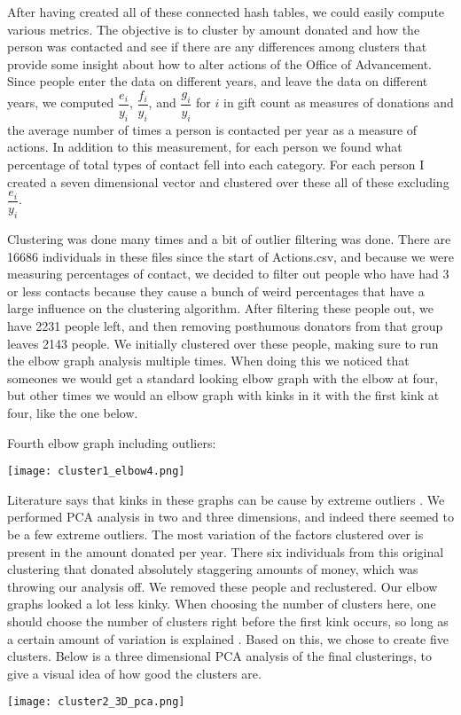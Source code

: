 \documentclass[../main.tex]{subfiles}
\begin{document}
After having created all of these connected hash tables, we could easily
compute various metrics. The objective is to cluster by amount donated and
how the person was contacted and see if there are any differences among
clusters that provide some insight about how to alter actions of the Office
of Advancement. Since people enter the data on different years, and leave
the data on different years, we computed $\dfrac{e_i}{y_i}$,
$\dfrac{f_i}{y_i}$, and $\dfrac{g_i}{y_i}$ for $i$ in gift count as measures
of donations and the average number of times a person is contacted per year
as a measure of actions. In addition to this measurement, for each person we
found what percentage of total types of contact fell into each category. For
each person I created a seven dimensional vector and clustered over these all
of these excluding $\dfrac{e_i}{y_i}$.

Clustering was done many times and a bit of outlier filtering was done.
There are 16686 individuals in these files since the start of Actions.csv,
and because we were measuring percentages of contact, we decided to filter
out people who have had 3 or less contacts because they cause a bunch of
weird percentages that have a large influence on the clustering algorithm.
After filtering these people out, we have 2231 people left, and then
removing posthumous donators from that group leaves 2143 people. We
initially clustered over these people, making sure to run the elbow graph
analysis multiple times. When doing this we noticed that someones we would
get a standard looking elbow graph with the elbow at four, but other times we would an elbow graph
with kinks in it with the first kink at four, like the one below.

Fourth elbow graph including outliers:

\vspace{1mm}

\texttt{[image: cluster1\_elbow4.png]}

Literature says that kinks in these graphs can be cause by extreme outliers
\cite{elbow1}. We performed PCA analysis in two and three dimensions, and
indeed there seemed to be a few extreme outliers. The most variation of the factors clustered over is present
in the amount donated per year. There six individuals from this original
clustering that donated absolutely staggering amounts of money, which was
throwing our analysis off. We removed these people and reclustered. Our
elbow graphs looked a lot less kinky. When choosing the number of clusters
here, one should choose the number of clusters right before the first kink
occurs, so long as a certain amount of variation is explained \cite{elbow1}.
Based on this, we chose to create five clusters.
Below is a three dimensional PCA analysis of the final clusterings, to give
a visual idea of how good the clusters are.

\vspace{1mm}

\texttt{[image: cluster2\_3D\_pca.png]}
\end{document}
